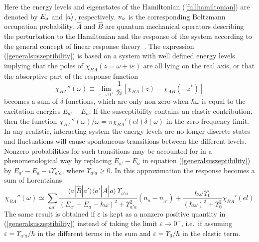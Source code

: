 Here the energy levels and eigenstates
 of the Hamiltonian (\ref{fullhamiltonian}) are denoted by $E_{{a}}$ and
$|{a} \rangle$, respectively.
$n_{{a}}$ is the corresponding 
Boltzmann occupation probability. 
$\hat A$ and $\hat B$ are
quantum mechanical operators describing the perturbation 
to the Hamiltonian and the response of the system
according to the general concept of linear response theory~\cite{jensen91-1}.
The expression (\ref{generalsuszeptibility}) is based on a system with well defined
energy levels implying that the poles of
$\chi_{BA}^{}(z=\omega+i\varepsilon)$ are all lying on the real axis,
or that the absorptive part of the response function
\begin{equation}
\chi_{BA}''(\omega)\equiv\lim_{\varepsilon\to0^+}\frac{1}{2i}
\left[\chi_{BA}^{}(z)-\chi_{AB}^{}(-z^\ast)\right]\label{e7}
\end{equation}
becomes a sum of $\delta$-functions, which are only non-zero when
$\hbar\omega$ is equal to the excitation energies $E_{a'}-E_a$. If
the susceptibility contains an elastic contribution, then the
function $\chi_{BA}''(\omega)/\omega=\pi\chi_{BA}'(el)\delta(\omega)$
in the zero frequency limit. In any realistic, interacting system the
energy levels are no longer discrete states and fluctuations will
cause spontaneous transitions between the different levels. Nonzero
probabilities for such transitions may be accounted for in a
phenomenological way by replacing $E_{a'}-E_a$ in equation (\ref{generalsuszeptibility})
by $E_{a'}-E_a-i\Upsilon_{a'a}$, where $\Upsilon_{a'a}\ge0$. In this
approximation the response becomes a sum of Lorentzians
\begin{equation}
\chi_{BA}''(\omega)\simeq \sum_{aa'}
\frac{\langle a|\hat{B}|a'\rangle\langle a'|\hat{A}|a\rangle\,\Upsilon_{a'a}^{}}
{(E_{a'}-E_a-\hbar\omega)^2+\Upsilon_{a'a}^2}(n_a^{}-n_{a'}^{})
+\frac{\hbar\omega\,\Upsilon_0^{}}{(\hbar\omega)^2+\Upsilon_0^2}\chi_{BA}'(el)\label{e8}
\end{equation}
The same result is obtained if $\varepsilon$ is kept as a nonzero
positive quantity in (\ref{generalsuszeptibility}) instead of taking the limit
$\varepsilon\to0^+$, i.e.\ if assuming
$\varepsilon=\Upsilon_{a'a}/\hbar$ in the different terms in the sum
and $\varepsilon=\Upsilon_0/\hbar$ in the elastic term.

